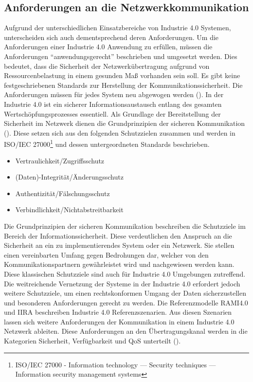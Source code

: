 \subsection{Anforderungen an die Netzwerkkommunikation}
\label{Grundlagen:Anforderungen}
Aufgrund der unterschiedlichen Einsatzbereiche von Industrie 4.0 Systemen, unterscheiden sich auch dementsprechend deren Anforderungen. Um die Anforderungen einer Industrie 4.0 Anwendung zu erfüllen, müssen die Anforderungen "`anwendungsgerecht"' beschrieben und umgesetzt werden. Dies bedeutet, dass die Sicherheit der Netzwerkübertragung aufgrund von Ressourcenbelastung in einem gesunden Maß vorhanden sein soll. Es gibt keine festgeschriebenen Standards zur Herstellung der Kommunikationssicherheit. Die Anforderungen müssen für jedes System neu abgewogen werden (\cite{BMWiSuK2016}). In der Industrie 4.0 ist ein sicherer Informationsaustausch entlang des gesamten Wertschöpfungsprozesses essentiell. Als Grundlage der Bereitstellung der Sicherheit im Netzwerk dienen die Grundprinzipien der sicheren Kommunikation (\cite{Schleupner2016}). Diese setzen sich aus den folgenden Schutzzielen zusammen und werden in \ac{ISO}/\ac{IEC} 27000\footnote{ISO/IEC 27000 - Information technology — Security techniques — Information security management systems} und dessen untergeordneten Standards beschrieben.

\begin{itemize}
  \item Vertraulichkeit/Zugriffsschutz
  \item (Daten)-Integrität/Änderungsschutz
  \item Authentizität/Fälschungsschutz
  \item Verbindlichkeit/Nichtabstreitbarkeit
\end{itemize}

Die Grundprinzipien der sicheren Kommunikation beschreiben die Schutzziele im Bereich der Informationssicherheit. Diese verdeutlichen den Anspruch an die Sicherheit an ein zu implementierendes System oder ein Netzwerk. Sie stellen einen vereinbarten Umfang gegen Bedrohungen dar, welcher von den Kommunikationspartnern gewährleistet wird und nachgewiesen werden kann. Diese klassischen Schutzziele sind auch für Industrie 4.0 Umgebungen zutreffend. Die weitreichende Vernetzung der Systeme in der Industrie 4.0 erfordert jedoch weitere Schutzziele, um einen rechtskonformen Umgang der Daten sicherzustellen und besonderen Anforderungen gerecht zu werden. Die Referenzmodelle \ac{RAMI4.0} und \ac{IIRA} beschreiben Industrie 4.0 Referenzszenarien. Aus diesen Szenarien lassen sich weitere Anforderungen der Kommunikation in einem Industrie 4.0 Netzwerk ableiten. Diese Anforderungen an den Übertragungskanal werden in die Kategorien Sicherheit, Verfügbarkeit und \ac{QoS} unterteilt (\cite{BMWiNeCon2016}).

